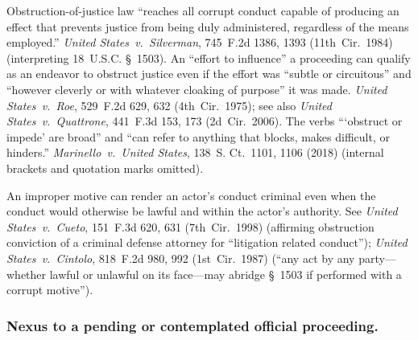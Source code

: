 Obstruction-of-justice law ``reaches all corrupt conduct capable of producing an effect that prevents justice from being duly administered, regardless of the means employed.''
\textit{United States~v.\ Silverman}, 745~F.2d 1386, 1393 (11th~Cir.~1984) (interpreting 18~U.S.C. \S~1503).
An ``effort to influence'' a proceeding can qualify as an endeavor to obstruct justice even if the effort was ``subtle or circuitous'' and ``however cleverly or with whatever cloaking of purpose'' it was made.
\textit{United States~v.\ Roe}, 529~F.2d 629, 632 (4th~Cir.~1975);
see also \textit{United States~v.\ Quattrone}, 441~F.3d 153, 173 (2d~Cir.~2006).
The verbs ``\thinspace`obstruct or impede' are broad'' and ``can refer to anything that blocks, makes difficult, or hinders.''
\textit{Marinello~v.\ United States}, 138~S. Ct.~1101, 1106 (2018) (internal brackets and quotation marks omitted).

An improper motive can render an actor's conduct criminal even when the conduct would otherwise be lawful and within the actor's authority.
See \textit{United States~v.\ Cueto}, 151~F.3d 620, 631 (7th~Cir.~1998) (affirming obstruction conviction of a criminal defense attorney for ``litigation related conduct''); \textit{United States~v.\ Cintolo}, 818~F.2d 980, 992 (1st~Cir.~1987) (``any act by any party---whether lawful or unlawful on its face---may abridge \S~1503 if performed with a corrupt motive'').

\subsubsection*{Nexus to a pending or contemplated official proceeding.}

